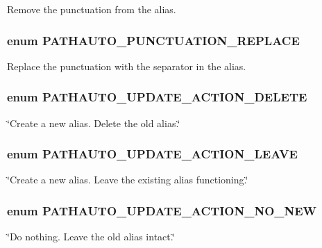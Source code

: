 \label{pathauto_8inc_af1defa37ae4d736ee2fd0701548faa6a}
Remove the punctuation from the alias. \hypertarget{pathauto_8inc_adad4cad26590ba34578f8f5e8e77e2de}{
\subsubsection[{PATHAUTO\_\-PUNCTUATION\_\-REPLACE}]{\setlength{\rightskip}{0pt plus 5cm}enum {\bf PATHAUTO\_\-PUNCTUATION\_\-REPLACE}}}
\label{pathauto_8inc_adad4cad26590ba34578f8f5e8e77e2de}
Replace the punctuation with the separator in the alias. \hypertarget{pathauto_8inc_a54c9ce36014ab76dfc253cc8a4b0846b}{
\subsubsection[{PATHAUTO\_\-UPDATE\_\-ACTION\_\-DELETE}]{\setlength{\rightskip}{0pt plus 5cm}enum {\bf PATHAUTO\_\-UPDATE\_\-ACTION\_\-DELETE}}}
\label{pathauto_8inc_a54c9ce36014ab76dfc253cc8a4b0846b}
\char`\"{}Create a new alias. Delete the old alias.\char`\"{} \hypertarget{pathauto_8inc_ad0bb9837044c24b6f3c0f4b2cd66c94b}{
\subsubsection[{PATHAUTO\_\-UPDATE\_\-ACTION\_\-LEAVE}]{\setlength{\rightskip}{0pt plus 5cm}enum {\bf PATHAUTO\_\-UPDATE\_\-ACTION\_\-LEAVE}}}
\label{pathauto_8inc_ad0bb9837044c24b6f3c0f4b2cd66c94b}
\char`\"{}Create a new alias. Leave the existing alias functioning.\char`\"{} \hypertarget{pathauto_8inc_a70d61a7cceaca1c59abf30153aa8156c}{
\subsubsection[{PATHAUTO\_\-UPDATE\_\-ACTION\_\-NO\_\-NEW}]{\setlength{\rightskip}{0pt plus 5cm}enum {\bf PATHAUTO\_\-UPDATE\_\-ACTION\_\-NO\_\-NEW}}}
\label{pathauto_8inc_a70d61a7cceaca1c59abf30153aa8156c}
\char`\"{}Do nothing. Leave the old alias intact.\char`\"{} 

